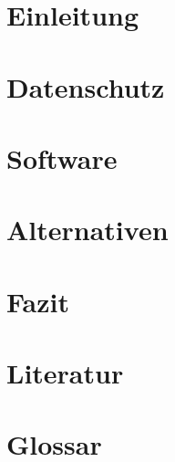 \documentclass[11pt]{article}
\begin{document}

    
    \newpage
    \tableofcontents
    \newpage
    \section{Einleitung}
    
    \pagebreak
    \section{Datenschutz}
    
    \pagebreak
    \section{Software}
    
    \pagebreak
    \section{Alternativen}
    
    \pagebreak
    \section{Fazit}
    
    \clearpage
    \pagestyle{plain} %
    \section{Literatur}
    
    \pagebreak
    \section{Glossar}
    
    \pagebreak
    
\end{document}
